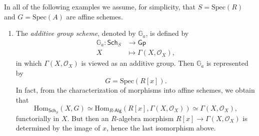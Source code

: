 \documentclass[../Main]{subfiles}
\begin{document}
\begin{ex}
	In all of the following examples we assume, for simplicity, that $S = \mathrm{Spec}(R)$
	and $G = \mathrm{Spec}(A)$ are affine schemes.
	\begin{enumerate}
		\item The {\em additive group scheme}, denoted by $\mathbb{G}_a$, is defined by
			\begin{align}
				\mathbb{G}_a\colon \mathsf{Sch}_{ S } &\longrightarrow \mathsf{Gp} \\
				X &\longmapsto \Gamma \left( X , \mathcal{O}_{ X } \right) \nonumber
			,\end{align} 
			in which $\Gamma \left( X , \mathcal{O}_{ X } \right)$ is viewed
			as an additive group.
			Then $\mathbb{G}_a$ is represented by 
			\begin{equation}
				G = \mathrm{Spec}(R[x])
			.\end{equation} 
			In fact, from the characterization of morphisms into affine schemes,
			we obtain that
			\begin{equation}
			\mathrm{Hom}_{\mathsf{Sch}_S} \left( X, G \right) \simeq
			\mathrm{Hom}_{R \text{-}\mathsf{Alg}} 
			\left( R[x], \Gamma \left( X , \mathcal{O}_{ X } \right) \right) \simeq
			\Gamma \left( X , \mathcal{O}_{ X } \right)
			,\end{equation} 
			functorially in $X$.
			But then an $R$-algebra morphism 
			$R[x] \to \Gamma \left( X , \mathcal{O}_{ X } \right)$
			is determined by the image of $x$, hence
			the last isomorphism above.


\end{enumerate}
\end{ex}
\end{document}
